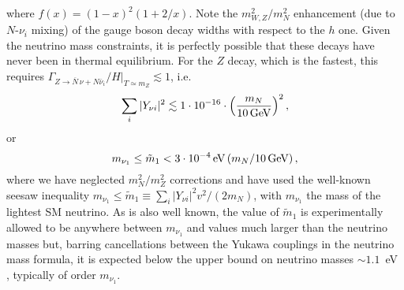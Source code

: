 \documentclass[prd,a4paper,twocolumn,preprintnumbers,nofootinbib,superscriptaddress]{revtex4}
\begin{document}
where $f(x) = (1-x)^2(1+2/x)$. 
Note the $m^2_{W,Z}/m_N^2$ enhancement (due to $N$-$\nu_i$ mixing) of the gauge boson decay widths with respect to the $h$ one.
Given the neutrino mass constraints, it is perfectly possible that these decays have never been in thermal equilibrium. 
For the $Z$ decay, which is the fastest, this requires 
$\Gamma_{Z\rightarrow \overline{N}\,\nu+N\bar{\nu}_i}/H|_{T\simeq m_Z}\lesssim 1$, i.e.
\begin{equation}
	\sum_i|Y_{\nu i}|^2 \lesssim 1 \cdot 10^{-16}\cdot \Big(\frac{m_N}{10\,\hbox{GeV}}\Big)^2\,,
	\label{Ynunonthermal}
\end{equation}
or
\begin{equation}
	m_{\nu_1}\leq \tilde{m}_1< 3\cdot 10^{-4}\,\hbox{eV} \, 
	(m_N/10\,\hbox{GeV}) \, ,
\end{equation}
where we have neglected $m^2_{N}/m_Z^2$ corrections and have used the well-known seesaw inequality 
$m_{\nu_1}  \leq  \tilde{m}_1\equiv \sum_i|Y_{\nu i}|^2v^2/(2 m_{N})$, with $m_{\nu_1}$  the mass of the lightest SM neutrino. 
As is also well known, the value of $\tilde{m}_1$ is experimentally allowed to be anywhere between $m_{\nu_1}$ and values much larger than the neutrino masses but, barring cancellations between the Yukawa couplings in the neutrino mass formula, it is expected below the upper bound on neutrino masses $\sim 1.1$~eV \cite{Schluter:2020gdr}, typically of order $m_{\nu_1}$. 
	
\end{document}
